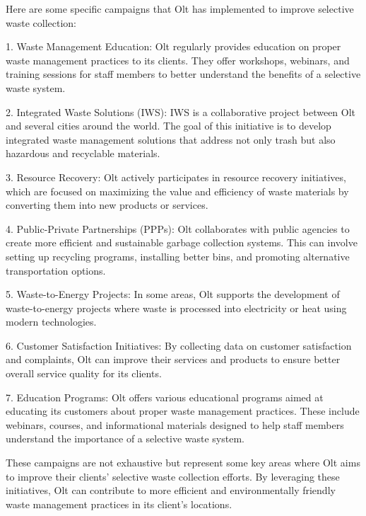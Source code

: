 \begin{enumerate}
Here are some specific campaigns that Olt has implemented to improve selective waste collection:

1. Waste Management Education: Olt regularly provides education on proper waste management practices to its clients. They offer workshops, webinars, and training sessions for staff members to better understand the benefits of a selective waste system.

2. Integrated Waste Solutions (IWS): IWS is a collaborative project between Olt and several cities around the world. The goal of this initiative is to develop integrated waste management solutions that address not only trash but also hazardous and recyclable materials.

3. Resource Recovery: Olt actively participates in resource recovery initiatives, which are focused on maximizing the value and efficiency of waste materials by converting them into new products or services.

4. Public-Private Partnerships (PPPs): Olt collaborates with public agencies to create more efficient and sustainable garbage collection systems. This can involve setting up recycling programs, installing better bins, and promoting alternative transportation options.

5. Waste-to-Energy Projects: In some areas, Olt supports the development of waste-to-energy projects where waste is processed into electricity or heat using modern technologies.

6. Customer Satisfaction Initiatives: By collecting data on customer satisfaction and complaints, Olt can improve their services and products to ensure better overall service quality for its clients.

7. Education Programs: Olt offers various educational programs aimed at educating its customers about proper waste management practices. These include webinars, courses, and informational materials designed to help staff members understand the importance of a selective waste system.

These campaigns are not exhaustive but represent some key areas where Olt aims to improve their clients' selective waste collection efforts. By leveraging these initiatives, Olt can contribute to more efficient and environmentally friendly waste management practices in its client's locations.
\end{enumerate}